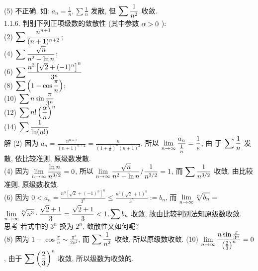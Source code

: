 \documentclass[a4paper,11pt,UTF8]{article}
\begin{document}
(5) 不正确. 如: $a_n=\frac{1}{n}, \sum \frac{1}{n}$ 发散, 但 $\displaystyle \displaystyle \displaystyle \sum \frac{1}{n^2}$ 收敛.\\
1.1.6. 判别下列正项级数的敛散性 (其中参数 $\displaystyle \displaystyle \displaystyle \alpha>0$ ):\\
(2) $\displaystyle \displaystyle \displaystyle \sum \frac{n^{n+1}}{(n+1)^{n+2}}$;\\
(4) $\displaystyle \displaystyle \displaystyle \sum \frac{\sqrt{n}}{n^2-\ln n}$;\\
(6) $\displaystyle \displaystyle \displaystyle \sum \frac{n^3\left[\sqrt{2}+(-1)^n\right]^n}{3^n}$\\
(8) $\displaystyle \displaystyle \displaystyle \sum\left(1-\cos \frac{\pi}{n}\right)$;\\
(10) $\displaystyle \displaystyle \displaystyle \sum n \sin \frac{\pi}{3^n}$\\
(12) $\displaystyle \displaystyle \displaystyle \sum n !\left(\frac{\alpha}{n}\right)^n$\\
(14) $\displaystyle \displaystyle \displaystyle \sum \frac{1}{\ln (n !)}$\\
解 (2) 因为 $a_n=\frac{n^{n+1}}{(n+1)^{n+2}}=\frac{n}{\left(1+\frac{1}{n}\right)^n(n+1)^2}$, 所以 $\displaystyle \displaystyle \displaystyle \lim _{n \rightarrow \infty} \frac{a_n}{\frac{1}{n}}=\frac{1}{e}$, 由 于 $\displaystyle \displaystyle \displaystyle \sum \frac{1}{n}$ 发散, 依比较准则, 原级数发散.\\
(4) 因为 $\displaystyle \displaystyle \displaystyle \lim _{n \rightarrow \infty} \frac{\ln n}{n^{3 / 2}}=0$, 所以 $\displaystyle \displaystyle \displaystyle \lim _{n \rightarrow \infty} \frac{\sqrt{n}}{n^2-\ln n} / \frac{1}{n^{3 / 2}}=1$, 而 $\displaystyle \displaystyle \displaystyle \sum \frac{1}{n^{3 / 2}}$ 收敛, 由比较准则, 原级数收敛.\\
(6) 因为 $0<a_n=\frac{n^3\left[\sqrt{2}+(-1)^n\right]^n}{3^n} \leq \frac{n^3(\sqrt{2}+1)^n}{3^n}:=b_n$, 而 $\displaystyle \displaystyle \displaystyle \lim _{n \rightarrow \infty} \sqrt[n]{b_n}=$ $\displaystyle \displaystyle \displaystyle \lim _{n \rightarrow \infty} \sqrt[n]{n^3} \cdot \frac{\sqrt{2}+1}{3}=\frac{\sqrt{2}+1}{3}<1, \sum b_n$ 收敛, 故由比较判别法知原级数收敛.\\
思考 若式中的 $3^n$ 换为 $2^n$, 敛散性又如何呢?\\
(8) 因为 $1-\cos \frac{\pi}{n} \sim \frac{\pi^2}{2 n^2}$, 而 $\displaystyle \displaystyle \displaystyle \sum \frac{1}{n^2}$ 收敛, 所以原级数收敛.
(10) $\displaystyle \displaystyle \displaystyle \lim _{n \rightarrow \infty} \frac{n \sin \frac{\pi}{3^n}}{\left(\frac{2}{3}\right)^n}=0$, 由于 $\displaystyle \displaystyle \displaystyle \sum\left(\frac{2}{3}\right)^n$ 收敛, 所以级数为收敛的.\\
\end{document}
